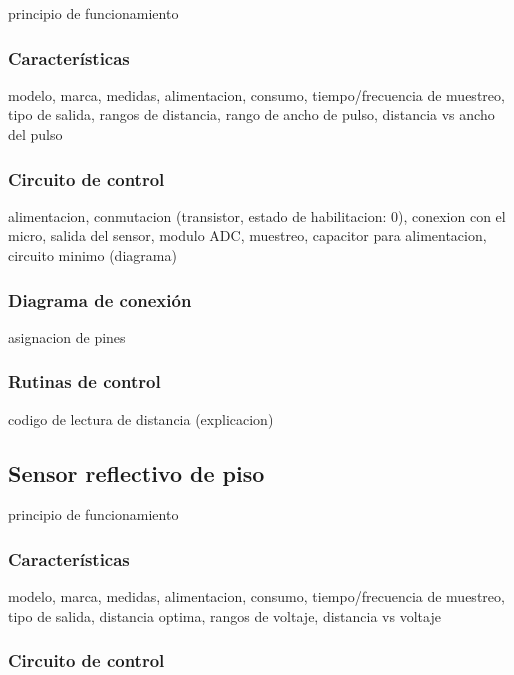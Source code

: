 principio de funcionamiento

\subsubsection{Caracter\'isticas}
\label{}

modelo, marca, medidas, alimentacion, consumo, tiempo/frecuencia de muestreo, tipo de salida, rangos de distancia, rango de ancho de pulso, distancia vs ancho del pulso

\subsubsection{Circuito de control}
\label{}

alimentacion, conmutacion (transistor, estado de habilitacion: 0), conexion con el micro, salida del sensor, modulo ADC, muestreo, capacitor para alimentacion, circuito minimo (diagrama)

\subsubsection{Diagrama de conexi\'on}
\label{}

asignacion de pines

\subsubsection{Rutinas de control}
\label{}

codigo de lectura de distancia (explicacion)

\subsection{Sensor reflectivo de piso}
\label{}

principio de funcionamiento

\subsubsection{Caracter\'isticas}
\label{}

modelo, marca, medidas, alimentacion, consumo, tiempo/frecuencia de muestreo, tipo de salida, distancia optima, rangos de voltaje, distancia vs voltaje

\subsubsection{Circuito de control}
\label{}

